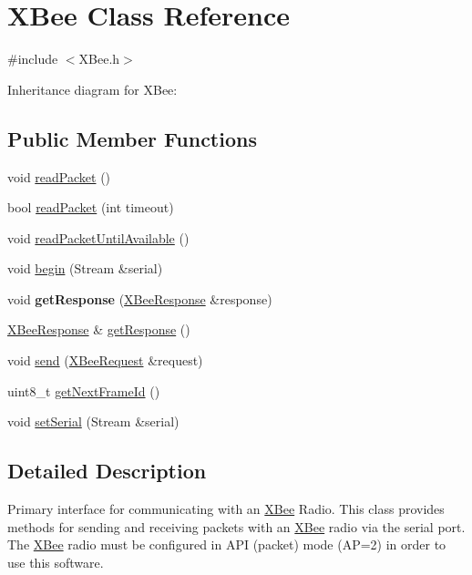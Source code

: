\hypertarget{class_x_bee}{}\section{X\+Bee Class Reference}
\label{class_x_bee}


{\ttfamily \#include $<$X\+Bee.\+h$>$}



Inheritance diagram for X\+Bee\+:
\subsection*{Public Member Functions}
\begin{DoxyCompactItemize}
\item 
void \hyperlink{class_x_bee_a7d788232f44e8b3c10dc686a0299fcc6}{read\+Packet} ()
\item 
bool \hyperlink{class_x_bee_ae1c9f3b53df50564ab9aca2716792b44}{read\+Packet} (int timeout)
\item 
void \hyperlink{class_x_bee_a594e2bb2ccb7b3fe7a2278b9324b4083}{read\+Packet\+Until\+Available} ()
\item 
void \hyperlink{class_x_bee_a2d170fc3f2412712adee0af794dc6263}{begin} (Stream \&serial)
\item 
\hypertarget{class_x_bee_ac88079aa744d36b26a0c6a0add939898}{}\label{class_x_bee_ac88079aa744d36b26a0c6a0add939898} 
void {\bfseries get\+Response} (\hyperlink{class_x_bee_response}{X\+Bee\+Response} \&response)
\item 
\hyperlink{class_x_bee_response}{X\+Bee\+Response} \& \hyperlink{class_x_bee_a18250def80e8b643aa1ccc15a98937f3}{get\+Response} ()
\item 
void \hyperlink{class_x_bee_a802387f468be8622941d16739ac848f2}{send} (\hyperlink{class_x_bee_request}{X\+Bee\+Request} \&request)
\item 
uint8\+\_\+t \hyperlink{class_x_bee_a25bd226e41517e8a66a13e531d31438d}{get\+Next\+Frame\+Id} ()
\item 
void \hyperlink{class_x_bee_a58ff19e5342060ca91aea247db99b927}{set\+Serial} (Stream \&serial)
\end{DoxyCompactItemize}


\subsection{Detailed Description}
Primary interface for communicating with an \hyperlink{class_x_bee}{X\+Bee} Radio. This class provides methods for sending and receiving packets with an \hyperlink{class_x_bee}{X\+Bee} radio via the serial port. The \hyperlink{class_x_bee}{X\+Bee} radio must be configured in A\+PI (packet) mode (AP=2) in order to use this software. 

